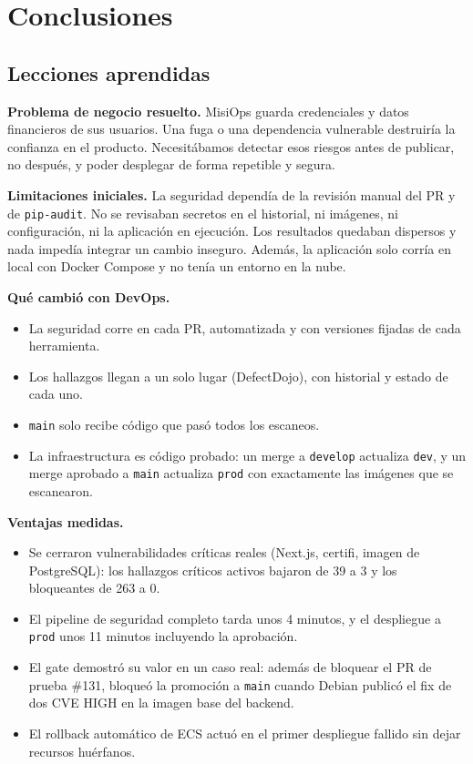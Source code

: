 \section{Conclusiones}

\subsection{Lecciones aprendidas}

\textbf{Problema de negocio resuelto.} MisiOps guarda credenciales y datos financieros de sus usuarios. Una fuga o una dependencia vulnerable destruiría la confianza en el producto. Necesitábamos detectar esos riesgos antes de publicar, no después, y poder desplegar de forma repetible y segura.

\textbf{Limitaciones iniciales.} La seguridad dependía de la revisión manual del PR y de \texttt{pip-audit}. No se revisaban secretos en el historial, ni imágenes, ni configuración, ni la aplicación en ejecución. Los resultados quedaban dispersos y nada impedía integrar un cambio inseguro. Además, la aplicación solo corría en local con Docker Compose y no tenía un entorno en la nube.

\textbf{Qué cambió con DevOps.}
\begin{itemize}
    \item La seguridad corre en cada PR, automatizada y con versiones fijadas de cada herramienta.
    \item Los hallazgos llegan a un solo lugar (DefectDojo), con historial y estado de cada uno.
    \item \texttt{main} solo recibe código que pasó todos los escaneos.
    \item La infraestructura es código probado: un merge a \texttt{develop} actualiza \texttt{dev}, y un merge aprobado a \texttt{main} actualiza \texttt{prod} con exactamente las imágenes que se escanearon.
\end{itemize}

\textbf{Ventajas medidas.}
\begin{itemize}
    \item Se cerraron vulnerabilidades críticas reales (Next.js, certifi, imagen de PostgreSQL): los hallazgos críticos activos bajaron de 39 a 3 y los bloqueantes de 263 a 0.
    \item El pipeline de seguridad completo tarda unos 4 minutos, y el despliegue a \texttt{prod} unos 11 minutos incluyendo la aprobación.
    \item El gate demostró su valor en un caso real: además de bloquear el PR de prueba \#131, bloqueó la promoción a \texttt{main} cuando Debian publicó el fix de dos CVE HIGH en la imagen base del backend.
    \item El rollback automático de ECS actuó en el primer despliegue fallido sin dejar recursos huérfanos.
\end{itemize}

